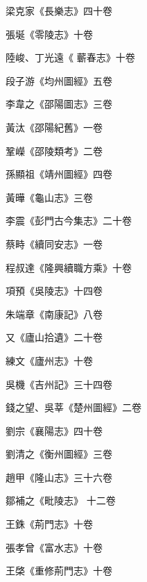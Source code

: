 \begin{pinyinscope}
 梁克家《長樂志》四十卷



 張埏《零陵志》十卷



 陸峻、丁光遠《
 蘄春志》十卷



 段子游《均州圖經》五卷



 李韋之《邵陽圖志》三卷



 黃汰《邵陽紀舊》一卷



 鞏嶸《邵陵類考》二卷



 孫顯祖《靖州圖經》四卷



 黃曄《龜山志》三卷



 李震《彭門古今集志》二十卷



 蔡畤《續同安志》一卷



 程叔達《隆興續職方乘》十卷



 項預《吳陵志》十四卷



 朱端章《南康記》八卷



 又《廬山拾遺》二十卷



 練文《廬州志》十卷



 吳機《吉州記》三十四卷



 錢之望、吳莘《楚州圖經》二卷



 劉宗《襄陽志》四十卷



 劉清之《衡州圖經》三卷



 趙甲《隆山志》三十六卷



 鄒補之《毗陵志》
 十二卷



 王銖《荊門志》十卷



 張孝曾《富水志》十卷



 王棨《重修荊門志》十卷




\end{pinyinscope}
